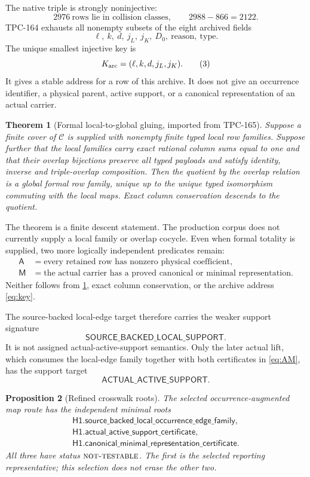 \documentclass[11pt]{article}
\newtheorem{theorem}{Theorem}[section]
\newtheorem{proposition}[theorem]{Proposition}
\theoremstyle{definition}
\theoremstyle{remark}
\newcommand{\NT}{\textnormal{\textsc{not-testable}}}
\begin{document}
The native triple is strongly noninjective:
\[
 2976\ \text{rows lie in collision classes},\qquad
 2988-866=2122.
\tag{2}\label{eq:collision}
\]
TPC-164 exhausts all nonempty subsets of the eight archived fields
\[
 \ell,\ k,\ d,\ j_L,\ j_K,\ D_0,\ \mathrm{reason},\ \mathrm{type}.
\]
The unique smallest injective key is
\[
 K_{\rm arc}=(\ell,k,d,j_L,j_K).
\tag{3}\label{eq:key}
\]
It gives a stable address for a row of this archive.  It does not
give an occurrence identifier, a physical parent, active support, or
a canonical representation of an actual carrier.

\begin{theorem}[Formal local-to-global gluing, imported from TPC-165]
\label{thm:gluing}
Suppose a finite cover of \(\mathcal C\) is supplied with nonempty
finite typed local row families.  Suppose further that the local
families carry exact rational column sums equal to one and that their
overlap bijections preserve all typed payloads and satisfy identity,
inverse and triple-overlap composition.  Then the quotient by the
overlap relation is a global formal row family, unique up to the
unique typed isomorphism commuting with the local maps.  Exact column
conservation descends to the quotient.
\end{theorem}

The theorem is a finite descent statement.  The production corpus
does not currently supply a local family or overlap cocycle.  Even
when formal totality is supplied, two more logically independent
predicates remain:
\[
\begin{aligned}
\mathsf A&=\text{every retained row has nonzero physical coefficient},\\
\mathsf M&=\text{the actual carrier has a proved canonical or
minimal representation}.
\end{aligned}
\tag{4}\label{eq:AM}
\]
Neither follows from \cref{thm:gluing}, exact column conservation, or
the archive address \eqref{eq:key}.

The source-backed local-edge target therefore carries the weaker
support signature
\[
\mathsf{SOURCE\_BACKED\_LOCAL\_SUPPORT}.
\]
It is not assigned actual-active-support semantics.  Only the later
actual lift, which consumes the local-edge family together with both
certificates in \eqref{eq:AM}, has the support target
\[
\mathsf{ACTUAL\_ACTIVE\_SUPPORT}.
\]

\begin{proposition}[Refined crosswalk roots]
\label{prop:roots}
The selected occurrence-augmented map route has the independent
minimal roots
\[
\begin{gathered}
\mathsf{H1.source\_backed\_local\_occurrence\_edge\_family},\\
\mathsf{H1.actual\_active\_support\_certificate},\\
\mathsf{H1.canonical\_minimal\_representation\_certificate}.
\end{gathered}
\tag{5}\label{eq:three-roots}
\]
All three have status \(\NT\).  The first is the selected reporting
representative; this selection does not erase the other two.
\end{proposition}
\end{document}
